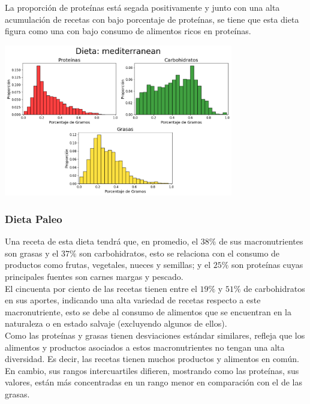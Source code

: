 \documentclass[12pt,a4paper]{article}
\begin{document}
            La proporción de proteínas está segada positivamente y junto con una 
            alta acumulación de recetas con bajo porcentaje de proteínas, se tiene que 
            esta dieta figura como una con bajo consumo de alimentos ricos en proteínas. 
            
            \begin{center}
                \includegraphics[width=0.75\textwidth]{Resources/2_03_plot_03.png}
            \end{center}

        \subsubsection{Dieta Paleo}

            Una receta de esta dieta tendrá que, en promedio, el $38\%$ de sus 
            macronutrientes son grasas y el $37\%$ son carbohidratos, esto se 
            relaciona con el consumo de productos como frutas, vegetales, nueces 
            y semillas; y el $25\%$ son proteínas cuyas principales fuentes son 
            carnes margas y pescado.\\

            El cincuenta por ciento de las recetas tienen entre el $19\%$ y $51\%$ 
            de carbohidratos en sus aportes, indicando una alta variedad de recetas 
            respecto a este macronutriente, esto se debe al consumo de alimentos que 
            se encuentran en la naturaleza o en estado salvaje (excluyendo algunos 
            de ellos).\\

            Como las proteínas y grasas tienen desviaciones estándar similares, refleja 
            que los alimentos y productos asociados a estos macronutrientes no tengan 
            una alta diversidad. Es decir, las recetas tienen muchos productos y alimentos 
            en común. En cambio, sus rangos intercuartiles difieren, mostrando como 
            las proteínas, sus valores, están más concentradas en un rango menor en 
            comparación con el de las grasas.
\end{document}
